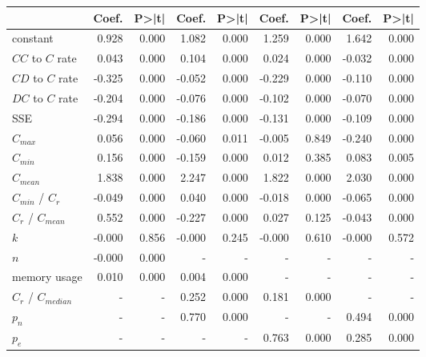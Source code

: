 \begin{tabular}{lrrrrrrrr}
\toprule
{} &  Coef. &  P>|t| &  Coef. &  P>|t| &  Coef. &  P>|t| &  Coef. &  P>|t| \\
\midrule
constant             &  0.928 &  0.000 &  1.082 &  0.000 &  1.259 &  0.000 &  1.642 &  0.000 \\
$CC$ to $C$ rate     &  0.043 &  0.000 &  0.104 &  0.000 &  0.024 &  0.000 & -0.032 &  0.000 \\
$CD$ to $C$ rate     & -0.325 &  0.000 & -0.052 &  0.000 & -0.229 &  0.000 & -0.110 &  0.000 \\
$DC$ to $C$ rate     & -0.204 &  0.000 & -0.076 &  0.000 & -0.102 &  0.000 & -0.070 &  0.000 \\
SSE                  & -0.294 &  0.000 & -0.186 &  0.000 & -0.131 &  0.000 & -0.109 &  0.000 \\
$C_{max}$            &  0.056 &  0.000 & -0.060 &  0.011 & -0.005 &  0.849 & -0.240 &  0.000 \\
$C_{min}$            &  0.156 &  0.000 & -0.159 &  0.000 &  0.012 &  0.385 &  0.083 &  0.005 \\
$C_{mean}$           &  1.838 &  0.000 &  2.247 &  0.000 &  1.822 &  0.000 &  2.030 &  0.000 \\
$C_{min}$ / $C_r$    & -0.049 &  0.000 &  0.040 &  0.000 & -0.018 &  0.000 & -0.065 &  0.000 \\
$C_r$ / $C_{mean}$   &  0.552 &  0.000 & -0.227 &  0.000 &  0.027 &  0.125 & -0.043 &  0.000 \\
$k$                  & -0.000 &  0.856 & -0.000 &  0.245 & -0.000 &  0.610 & -0.000 &  0.572 \\
$n$                  & -0.000 &  0.000 &      - &      - &      - &      - &      - &      - \\
memory usage         &  0.010 &  0.000 &  0.004 &  0.000 &      - &      - &      - &      - \\
$C_r$ / $C_{median}$ &      - &      - &  0.252 &  0.000 &  0.181 &  0.000 &      - &      - \\
$p_n$                &      - &      - &  0.770 &  0.000 &      - &      - &  0.494 &  0.000 \\
$p_e$                &      - &      - &      - &      - &  0.763 &  0.000 &  0.285 &  0.000 \\
\bottomrule
\end{tabular}

